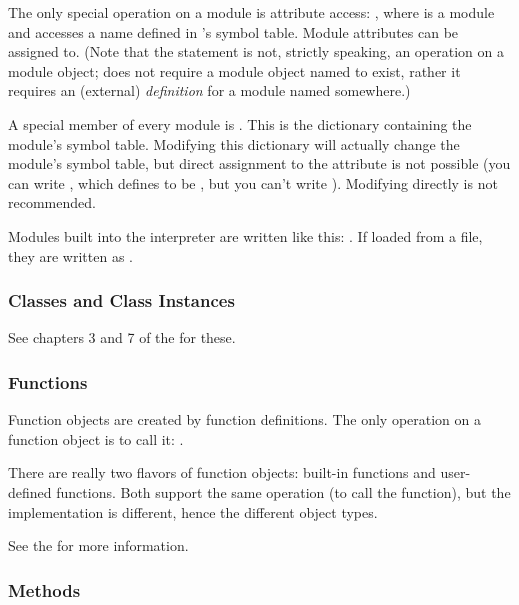 The only special operation on a module is attribute access:
, where  is a module and 
accesses a name defined in 's symbol table.  Module attributes
can be assigned to.  (Note that the  statement is not,
strictly speaking, an operation on a module object;  does not require a module object named  to exist,
rather it requires an (external) \emph{definition} for a module named
 somewhere.)

A special member of every module is .
This is the dictionary containing the module's symbol table.
Modifying this dictionary will actually change the module's symbol
table, but direct assignment to the  attribute is not
possible (you can write , which
defines  to be , but you can't write
).  Modifying  directly
is not recommended.

Modules built into the interpreter are written like this:
.  If loaded from a file, they are
written as .


\subsubsection{Classes and Class Instances \label{typesobjects}}

See chapters 3 and 7 of the  for these.


\subsubsection{Functions \label{typesfunctions}}

Function objects are created by function definitions.  The only
operation on a function object is to call it:
.

There are really two flavors of function objects: built-in functions
and user-defined functions.  Both support the same operation (to call
the function), but the implementation is different, hence the
different object types.

See the  for more
information.

\subsubsection{Methods \label{typesmethods}}

